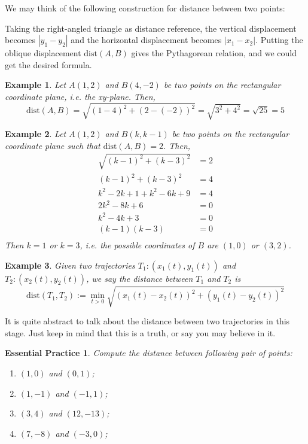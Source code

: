 \documentclass[12pt]{article}
\newtheorem*{example}{Example}
\newtheorem{exercise}{Essential Practice}[subsection]
\begin{document}
    We may think of the following construction for distance between two points:

    Taking the right-angled triangle as distance reference, the vertical displacement becomes $|y_1-y_2|$ and the horizontal displacement becomes $|x_1-x_2|$. Putting the oblique displacement $\mathrm{dist}(A,B)$ gives the Pythagorean relation, and we could get the desired formula.

    \begin{example}
        Let $A(1,2)$ and $B(4,-2)$ be two points on the rectangular coordinate plane, i.e. the xy-plane. Then, $$\mathrm{dist}(A,B)=\sqrt{(1-4)^2+(2-(-2))^2}=\sqrt{3^2+4^2}=\sqrt{25}=5$$
    \end{example}

    \begin{example}
        Let $A(1,2)$ and $B(k,k-1)$ be two points on the rectangular coordinate plane such that $\mathrm{dist}(A,B)=2$. Then, \begin{align*}
            \sqrt{(k-1)^2+(k-3)^2}&=2\\
            (k-1)^2+(k-3)^2&=4\\
            k^2-2k+1+k^2-6k+9&=4\\
            2k^2-8k+6&=0\\
            k^2-4k+3&=0\\
            (k-1)(k-3)&=0\\
        \end{align*}
        Then $k=1$ or $k=3$, i.e. the possible coordinates of $B$ are $(1,0)$ or $(3,2)$.
    \end{example}

    \begin{example}
        Given two trajectories $T_1:(x_1(t),y_1(t))$ and $T_2:(x_2(t),y_2(t))$, we say the distance between $T_1$ and $T_2$ is $$\mathrm{dist}(T_1,T_2):=\min_{t>0}\sqrt{(x_1(t)-x_2(t))^2+(y_1(t)-y_2(t))^2}$$
    \end{example}

    It is quite abstract to talk about the distance between two trajectories in this stage. Just keep in mind that this is a truth, or say you may believe in it.

    \begin{exercise}
        Compute the distance between following pair of points:\begin{enumerate}
            \item $(1,0)$ and $(0,1)$;
            \item $(1,-1)$ and $(-1,1)$;
            \item $(3,4)$ and $(12,-13)$;
            \item $(7,-8)$ and $(-3,0)$;
        \end{enumerate}
    \end{exercise}
\end{document}
